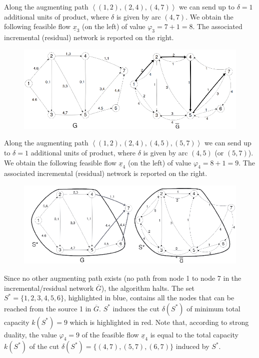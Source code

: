 \documentclass[12pt, a4paper]{report}
\newtheorem[style=M,bodystyle=\normalfont]{theorem}{Theorem}
\newtheorem[style=M,bodystyle=\normalfont]{corollary}{Corollary}
\newtheorem[style=M,bodystyle=\normalfont]{lemma}{Lemma}
\newtheorem[style=M,bodystyle=\normalfont]{definition}{Definition}
\begin{document}
        Along the augmenting path $\left\langle (1, 2),(2, 4),(4, 7) \right\rangle $ we can send up to $\delta = 1$ additional units of product, where $\delta$ is given 
        by arc $(4, 7)$. We obtain the following feasible flow $\underline{x}_3$ (on the left) of value $\varphi_3 = 7 + 1 = 8$. The associated incremental (residual) 
        network is reported on the right.
        \begin{figure}[H]
            \centering
            \includegraphics[width=0.9\linewidth]{images/maxcut4.png}
        \end{figure}
        Along the augmenting path $\left\langle (1, 2),(2, 4),(4, 5),(5, 7) \right\rangle $ we can send up to $\delta = 1$ additional units of product, where $\delta$ is 
        given by arc $(4, 5)$ (or $(5, 7)$). We obtain the following feasible flow $\underline{x}_4$ (on the left) of value $\varphi_4 = 8 + 1 = 9$. The associated 
        incremental (residual) network is reported on the right.
        \begin{figure}[H]
            \centering
            \includegraphics[width=0.9\linewidth]{images/maxcut5.png}
        \end{figure}
        Since no other augmenting path exists (no path from node 1 to node 7 in the incremental/residual network $\overline{G}$), the algorithm halts. The set 
        $S^{*} = \{1, 2, 3, 4, 5, 6\}$, highlighted in blue, contains all the nodes that can be reached from the source 1 in $\overline{G}$. $S^{*}$ induces the 
        cut $\delta(S^{*})$ of minimum total capacity $k(S^{*}) = 9$ which is highlighted in red. Note that, according to strong duality, the value $\varphi_4=9$ of the 
        feasible flow $\underline{x}_4$ is equal to the total capacity $k(S^{*})$ of the cut $\delta(S^{*}) = \{(4, 7),(5, 7),(6, 7)\}$ induced by $S^{*}$.
\end{document}
